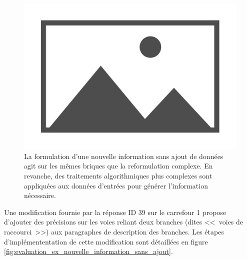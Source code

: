 \begin{figure}[ht]
    \centering
    \includegraphics{images/placeholder.jpg}
    \caption{La formulation d'une nouvelle information sans ajout de données agit sur les mêmes briques que la reformulation complexe. En revanche, des traitements algorithmiques plus complexes sont appliquées aux données d'entrées pour générer l'information nécessaire.}
    \label{fig:evaluation_nouvelle_information_sans_ajout}
\end{figure}

\newpar{}

Une modification fournie par la réponse ID 39 sur le carrefour 1 propose d'ajouter des précisions sur les voies reliant deux branches (dites <<~voies de raccourci~>>) aux paragraphes de description des branches. Les étapes d'implémententation de cette modification sont détaillées en figure \ref{fig:evaluation_ex_nouvelle_information_sans_ajout}.

